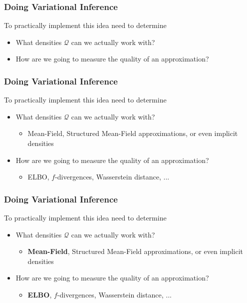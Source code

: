 \documentclass[10pt,mathserif]{beamer}
\begin{document}
\begin{frame}
  \frametitle{Doing Variational Inference}
  To practically implement this idea need to determine
  \begin{itemize}
  \item What densities $\mathcal{Q}$ can we actually work with?
  \item How are we going to measure the quality of an approximation?
  \end{itemize}
\end{frame}

\begin{frame}
  \frametitle{Doing Variational Inference}
  To practically implement this idea need to determine
  \begin{itemize}
  \item What densities $\mathcal{Q}$ can we actually work with?
    \begin{itemize}
    \item Mean-Field, Structured Mean-Field approximations, or even implicit densities
    \end{itemize}
  \item How are we going to measure the quality of an approximation?
    \begin{itemize}
    \item ELBO, $f$-divergences, Wasserstein distance, ...
    \end{itemize}
  \end{itemize}
\end{frame}

\begin{frame}
  \frametitle{Doing Variational Inference}
  To practically implement this idea need to determine
  \begin{itemize}
  \item What densities $\mathcal{Q}$ can we actually work with?
    \begin{itemize}
    \item \textbf{Mean-Field}, Structured Mean-Field approximations, or even implicit densities
    \end{itemize}
  \item How are we going to measure the quality of an approximation?
    \begin{itemize}
    \item \textbf{ELBO}, $f$-divergences, Wasserstein distance, ...
    \end{itemize}
  \end{itemize}
\end{frame}
\end{document}
